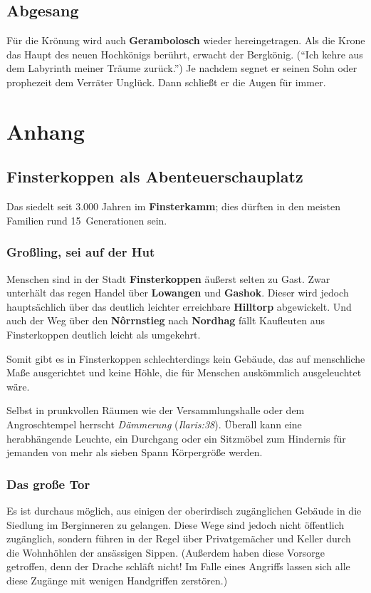 \subsection{Abgesang}
Für die Krönung wird auch \textbf{Gerambolosch} wieder hereingetragen.
Als die Krone das Haupt des neuen Hochkönigs berührt, erwacht der Bergkönig. (\enquote{Ich kehre aus dem Labyrinth meiner Träume zurück.}) Je nachdem segnet er seinen Sohn oder prophezeit dem Verräter Unglück.
Dann schließt er die Augen für immer.

\spaltenende
\section{Anhang}
\spaltenanfang

\subsection{Finsterkoppen als Abenteuer\-schauplatz}

Das \fkv siedelt seit 3.000 Jahren im \textbf{Finsterkamm}; dies dürften in den meisten Familien rund 15~Generationen sein.

\subsubsection{Großling, sei auf der Hut}
Menschen sind in der Stadt \textbf{Finsterkoppen} äußerst selten zu Gast. Zwar unterhält das \fkv regen Handel über \textbf{Lowangen} und \textbf{Gashok}.
Dieser wird jedoch hauptsächlich über das deutlich leichter erreichbare \textbf{Hilltorp} abgewickelt.
Und auch der Weg über den \textbf{N\^orrnstieg} nach \textbf{Nordhag} fällt Kaufleuten aus Finsterkoppen deutlich leicht als umgekehrt.

Somit gibt es in Finsterkoppen schlechterdings kein Gebäude, das auf menschliche Maße ausgerichtet und keine Höhle, die für Menschen auskömmlich ausgeleuchtet wäre.

Selbst in prunkvollen Räumen wie der Versammlungshalle oder dem Angroschtempel herrscht \emph{Dämmerung} (\emph{Ilaris:38}).
Überall kann eine herabhängende Leuchte, ein Durchgang oder ein Sitzmöbel zum Hindernis für jemanden von mehr als sieben Spann Körpergröße werden.

\subsubsection{Das große Tor}
Es ist durchaus möglich, aus einigen der oberirdisch zugänglichen Gebäude in die Siedlung im Berginneren zu gelangen.
Diese Wege sind jedoch nicht öffentlich zugänglich, sondern führen in der Regel über Privatgemächer und Keller durch die Wohnhöhlen der ansässigen Sippen. 
(Außerdem haben diese Vorsorge getroffen, denn der Drache schläft nicht! Im Falle eines Angriffs lassen sich alle diese Zugänge mit wenigen Handgriffen zerstören.)

